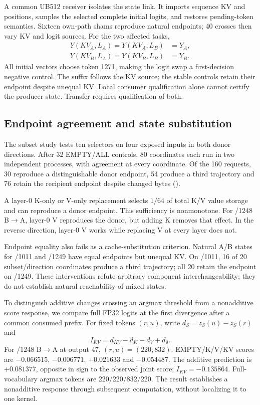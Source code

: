 A common UB512 receiver isolates the state link. It imports sequence KV and positions, samples the selected complete initial logits, and restores pending-token semantics. Sixteen own-path shams reproduce natural endpoints; 40 crosses then vary KV and logit sources. For the two affected tasks,
\begin{align}
Y(KV_A,L_A)=Y(KV_A,L_B)&=Y_A,\\
Y(KV_B,L_A)=Y(KV_B,L_B)&=Y_B.
\label{eq:cross}
\end{align}
All initial vectors choose token 1271, making the logit swap a first-decision negative control. The suffix follows the KV source; the stable controls retain their endpoint despite unequal KV. Local consumer qualification alone cannot certify the producer state. Transfer requires qualification of both.

\subsection{Endpoint agreement and state substitution}
\label{sec:composition}
The subset study tests ten selectors on four exposed inputs in both donor directions. After 32 EMPTY/ALL controls, 80 coordinates each run in two independent processes, with agreement at every coordinate. Of the 160 requests, 30 reproduce a distinguishable donor endpoint, 54 produce a third trajectory and 76 retain the recipient endpoint despite changed bytes ().

A layer-0 K-only or V-only replacement selects $1/64$ of total K/V value storage and can reproduce a donor endpoint. This sufficiency is nonmonotone. For /1248 B$\to$A, layer-0 V reproduces the donor, but adding K removes that effect. In the reverse direction, layer-0 V works while replacing V at every layer does not.

Endpoint equality also fails as a cache-substitution criterion. Natural A/B states for /1011 and /1249 have equal endpoints but unequal KV. On /1011, 16 of 20 subset/direction coordinates produce a third trajectory; all 20 retain the endpoint on /1249. These interventions refute arbitrary component interchangeability; they do not establish natural reachability of mixed states.

To distinguish additive changes crossing an argmax threshold from a nonadditive score response, we compare full FP32 logits at the first divergence after a common consumed prefix. For fixed tokens $(r,u)$, write $d_S=z_S(u)-z_S(r)$ and
\begin{equation}
I_{KV}=d_{KV}-d_K-d_V+d_\emptyset.
\label{eq:interaction}
\end{equation}
For /1248 B$\to$A at output 47, $(r,u)=(220,832)$. EMPTY/K/V/KV scores are $-0.066515$, $-0.006771$, $+0.021633$ and $-0.054487$. The additive prediction is $+0.081377$, opposite in sign to the observed joint score; $I_{KV}=-0.135864$. Full-vocabulary argmax tokens are 220/220/832/220. The result establishes a nonadditive response through subsequent computation, without localizing it to one kernel.


